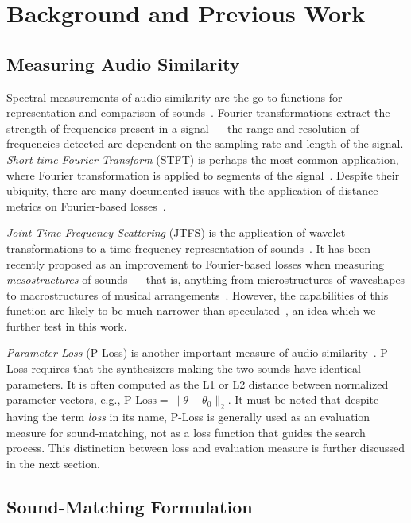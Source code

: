 \documentclass{article}
\begin{document}
\section{Background and Previous Work}

\subsection{Measuring Audio Similarity}
\label{sec:measuring_audio_similarity}

Spectral measurements of audio similarity are the go-to functions for representation and comparison of sounds~\cite{smith2007mathematics}. Fourier transformations extract the strength of frequencies present in a signal --- the range and resolution of frequencies detected are dependent on the sampling rate and length of the signal. \textit{Short-time Fourier Transform} (STFT) is perhaps the most common application, where Fourier transformation is applied to segments of the signal~\cite{smith2007mathematics}. Despite their ubiquity, there are many documented issues with the application of distance metrics on Fourier-based losses~\cite{turian2020sorry,salimi2025evaluating,vahidi2023mesostructures}.

\textit{Joint Time-Frequency Scattering} (JTFS) is the application of wavelet transformations to a time-frequency representation of sounds~\cite{vahidi2023mesostructures,anden2015joint}. It has been recently proposed as an improvement to Fourier-based losses when measuring \textit{mesostructures} of sounds --- that is, anything from microstructures of waveshapes to macrostructures of musical arrangements~\cite{lostanlen2019shape}. However, the capabilities of this function are likely to be much narrower than speculated~\cite{salimi2025evaluating}, an idea which we further test in this work.

\textit{Parameter Loss} (P-Loss) is another important measure of audio similarity~\cite{yee2018automatic,esling2019flow}. P-Loss requires that the synthesizers making the two sounds have identical parameters. It is often computed as the L1 or L2 distance between normalized parameter vectors, e.g., $\text{P-Loss} = \|\theta - \theta_0\|_2$. It must be noted that despite having the term \textit{loss} in its name, P-Loss is generally used as an evaluation measure for sound-matching, not as a loss function that guides the search process. This distinction between loss and evaluation measure is further discussed in the next section.

\subsection{Sound-Matching Formulation}
\label{sec:sound_matching_formulation}
\end{document}
